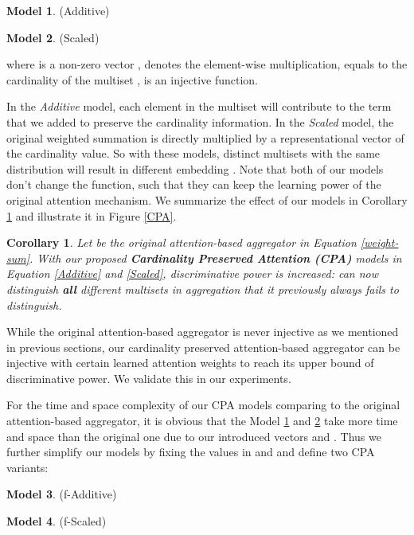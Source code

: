 \documentclass[letterpaper]{article} \usepackage{aaai20}  \usepackage{times}  \usepackage{helvet} \usepackage{courier}  \usepackage[hyphens]{url}  \usepackage{graphicx} \urlstyle{rm} \def\UrlFont{\rm}  \usepackage{graphicx}  \frenchspacing  \setlength{\pdfpagewidth}{8.5in}  \setlength{\pdfpageheight}{11in}
\theoremstyle{plain}
\newtheorem{corollary}{Corollary}
\theoremstyle{definition}
\newtheorem{model}{Model}
\begin{document}
\begin{model}\label{Additive-model}
(Additive)

\end{model}
\begin{model}\label{Scaled-model}
(Scaled)

where  is a non-zero vector ,  denotes the element-wise multiplication,  equals to the cardinality of the multiset ,  is an injective function.
\end{model}

In the \textit{Additive} model, each element in the multiset will contribute to the term that we added to preserve the cardinality information. In the \textit{Scaled} model, the original weighted summation is directly multiplied by a representational vector of the cardinality value. So with these models, distinct multisets with the same distribution will result in different embedding . Note that both of our models don't change the  function, such that they can keep the learning power of the original attention mechanism. We summarize the effect of our models in Corollary \ref{corollary:modified-att} and illustrate it in Figure \ref{CPA}.

\begin{corollary} \label{corollary:modified-att}
Let  be the original attention-based aggregator in Equation \ref{weight-sum}. With our proposed \textbf {Cardinality Preserved Attention (CPA)} models in Equation \ref{Additive} and \ref{Scaled},  discriminative power is increased:  can now distinguish \textbf {all} different multisets in aggregation that it previously always fails to distinguish.
\end{corollary}

While the original attention-based aggregator is never injective as we mentioned in previous sections, our cardinality preserved attention-based aggregator can be injective with certain learned attention weights to reach its upper bound of discriminative power. We validate this in our experiments. 

For the time and space complexity of our CPA models comparing to the original attention-based aggregator, it is obvious that the Model \ref{Additive-model} and \ref{Scaled-model} take more time and space than the original one due to our introduced vectors  and . Thus we further simplify our models by fixing the values in  and  and define two CPA variants:

\begin{model}\label{f-Additive-model}
(f-Additive)

\end{model}
\begin{model}\label{f-Scaled-model}
(f-Scaled)

\end{model}
\end{document}
